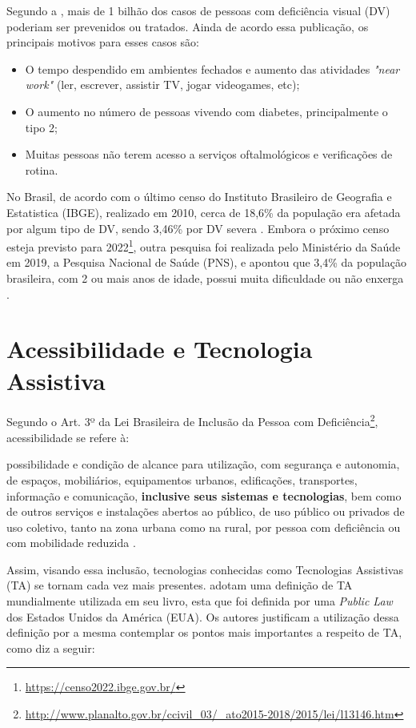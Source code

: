 Segundo a , mais de 1 bilhão dos casos de pessoas com deficiência visual (DV) poderiam ser prevenidos ou
tratados. Ainda de acordo essa publicação, os principais motivos para esses casos são:

\begin{itemize}
    \item O tempo despendido em ambientes fechados e aumento das atividades \textit{"near work"} (ler, escrever, assistir TV, jogar videogames, etc);
    \item O aumento no número de pessoas vivendo com diabetes, principalmente o tipo 2;
    \item Muitas pessoas não terem acesso a serviços oftalmológicos e verificações de rotina.
\end{itemize}

No Brasil, de acordo com o último censo do Instituto Brasileiro de Geografia e Estatistica (IBGE), realizado em 2010,
cerca de 18,6\% da população era afetada por algum tipo de DV, sendo 3,46\% por DV severa
\cite{IBGE2012}. Embora o próximo censo esteja previsto para 2022\footnote{\url{https://censo2022.ibge.gov.br/}}, outra pesquisa
foi realizada pelo Ministério da Saúde em 2019, a Pesquisa Nacional de Saúde (PNS), e apontou que 3,4\% da população brasileira,
com 2 ou mais anos de idade, possui muita dificuldade ou não enxerga \cite{stopa2020pesquisa}.

\section{Acessibilidade e Tecnologia Assistiva}

Segundo o Art. 3º da Lei Brasileira de Inclusão da Pessoa com Deficiência\footnote{\url{http://www.planalto.gov.br/ccivil_03/_ato2015-2018/2015/lei/l13146.htm}},
acessibilidade se refere à:

\begin{citacao}
    possibilidade e condição de alcance para utilização, com segurança e autonomia, de espaços, mobiliários, equipamentos urbanos,
    edificações, transportes, informação e comunicação, \textbf{inclusive seus sistemas e tecnologias}, bem como de outros serviços e
    instalações abertos ao público, de uso público ou privados de uso coletivo, tanto na zona urbana como na rural, por pessoa com
    deficiência ou com mobilidade reduzida \cite{Brasil2015}.
\end{citacao}

Assim, visando essa inclusão, tecnologias conhecidas como Tecnologias Assistivas (TA) se tornam cada vez mais presentes.
 adotam uma definição de TA mundialmente utilizada em seu livro, esta que foi definida por uma \textit{Public Law}
dos Estados Unidos da América (EUA). Os autores justificam a utilização dessa definição por a mesma contemplar os pontos mais
importantes a respeito de TA, como diz a seguir:


